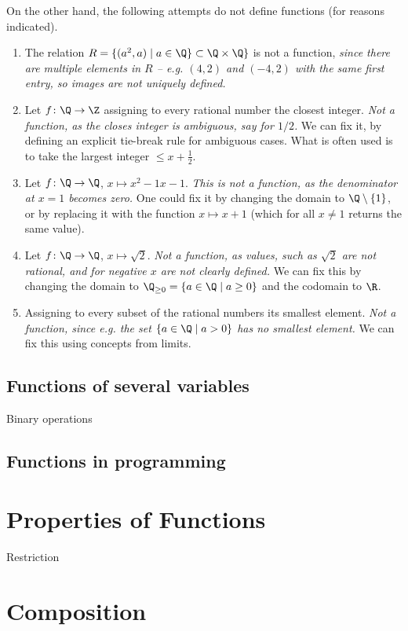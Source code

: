 On the other hand, the following attempts do not define functions (for
reasons indicated).
\begin{enumerate}
\item The relation $R=\{(a^2,a)\mid a\in\Q\}\subset\Q\times\Q\}$ is not a
function, {\em since there are multiple elements in $R$ -- e.g. $(4,2)$ and
$(-4,2)$ with the same first entry, so images are not uniquely defined.}
\item
Let $f\colon\Q\to\Z$ assigning to every rational number the
closest integer. {\em Not a function, as the closes integer is ambiguous,
say for $1/2$.} We can fix it, by defining an explicit tie-break rule for
ambiguous cases. What is often used is to take the largest integer $\le
x+\frac{1}{2}$.
\item
Let $f\colon\Q\to\Q$, $x\mapsto{x^2-1}{x-1}$. {\em This is not a function,
as the denominator at $x=1$ becomes zero.} One could fix it by changing the
domain to $\Q\setminus\{1\}$, or by replacing it with the function $x\mapsto
x+1$ (which for all $x\not=1$ returns the same value).
\item
Let $f\colon\Q\to\Q$, $x\mapsto\sqrt{2}$. {\em Not a function, as values,
such as $\sqrt{2}$ are not rational, and for negative $x$ are not clearly
defined.}
We can fix this by changing the domain to $\Q_{\ge 0}=\{a\in\Q\mid
a\ge 0\}$ and the codomain to $\R$.
\item Assigning to every subset of the rational numbers its smallest
element. {\em Not a function, since e.g. the set $\{a\in\Q\mid a>0\}$ has no
smallest element.} We can fix this using concepts from
limits.
\end{enumerate}


\subsection{Functions of several variables}

Binary operations

\subsection{Functions in programming}

\section{Properties of Functions}

Restriction

\section{Composition}

